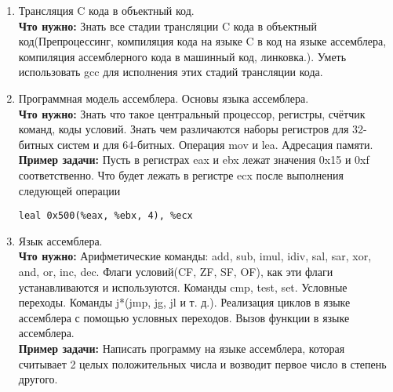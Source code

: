\documentclass{article}
\begin{document}
\begin{enumerate}
\item Трансляция C кода в объектный код.\\
\textbf{Что нужно:} Знать все стадии трансляции C кода в объектный код(Препроцессинг, компиляция кода на языке C в код на языке ассемблера, компиляция ассемблерного кода в машинный код, линковка.). Уметь использовать gcc для исполнения этих стадий трансляции кода.

\item Программная модель ассемблера. Основы языка ассемблера.\\
\textbf{Что нужно:} Знать что такое центральный процессор, регистры, счётчик команд, коды условий. Знать чем различаются наборы регистров для 32-битных систем и для 64-битных. Операция mov и lea. Адресация памяти.\\
\textbf{Пример задачи:} Пусть в регистрах eax и ebx лежат значения 0x15 и 0xf соответственно. Что будет лежать в регистре ecx после выполнения следующей операции 
\begin{lstlisting}
leal 0x500(%eax, %ebx, 4), %ecx
\end{lstlisting}

\item Язык ассемблера.\\
\textbf{Что нужно:} Арифметические команды: add, sub, imul, idiv, sal, sar, xor, and, or, inc, dec. Флаги условий(CF, ZF, SF, OF), как эти флаги устанавливаются и используются. Команды cmp, test, set. Условные переходы. Команды j*(jmp, jg, jl и т. д.). Реализация циклов в языке ассемблера с помощью условных переходов. Вызов функции в языке ассемблера.\\
\textbf{Пример задачи:} Написать программу на языке ассемблера, которая считывает 2 целых положительных числа и возводит первое число в степень другого.
\end{enumerate}
\end{document}

